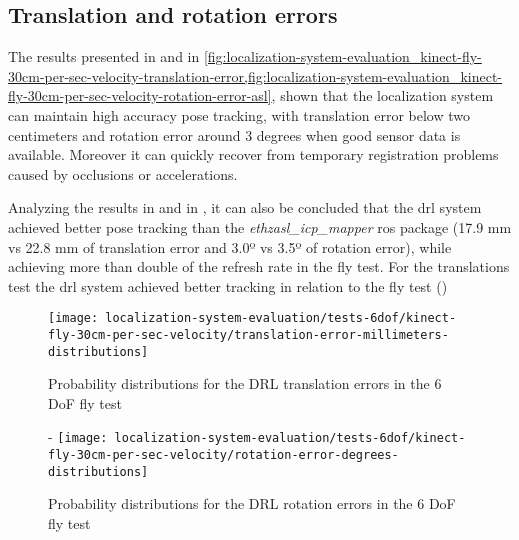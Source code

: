 \subsection{Translation and rotation errors}

The results presented in  and in \cref{fig:localization-system-evaluation_kinect-fly-30cm-per-sec-velocity-translation-error,fig:localization-system-evaluation_kinect-fly-30cm-per-sec-velocity-rotation-error-asl}, shown that the localization system can maintain high accuracy pose tracking, with translation error below two centimeters and rotation error around 3 degrees when good sensor data is available. Moreover it can quickly recover from temporary registration problems caused by occlusions or accelerations.

Analyzing the results in  and in , it can also be concluded that the \gls{drl} system achieved better pose tracking than the \emph{ethzasl\_icp\_mapper} \gls{ros} package (17.9 mm vs 22.8 mm of translation error and 3.0º vs 3.5º of rotation error), while achieving more than double of the refresh rate in the fly test. For the translations test the \gls{drl} system achieved better tracking in relation to the fly test ()




\begin{figure}[H]
	\centering
	\texttt{[image: localization-system-evaluation/tests-6dof/kinect-fly-30cm-per-sec-velocity/translation-error-millimeters-distributions]}
	\caption{Probability distributions for the DRL translation errors in the 6 DoF fly test}
	\label{fig:localization-system-evaluation_kinect-fly-30cm-per-sec-velocity-translation-error}
\end{figure}

\begin{figure}[H]
	\centering
-	\texttt{[image: localization-system-evaluation/tests-6dof/kinect-fly-30cm-per-sec-velocity/rotation-error-degrees-distributions]}
	\caption{Probability distributions for the DRL rotation errors in the 6 DoF fly test}
	\label{fig:localization-system-evaluation_kinect-fly-30cm-per-sec-velocity-rotation-error}
\end{figure}

